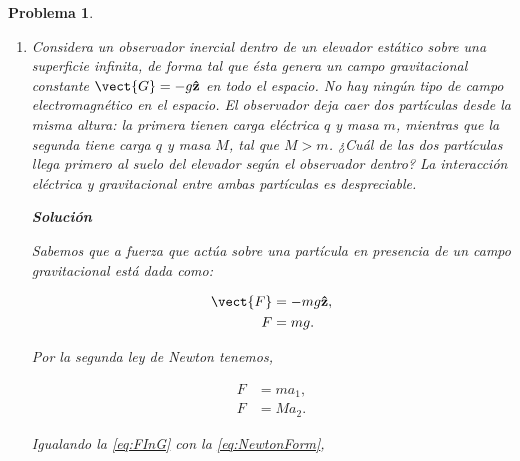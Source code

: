 \documentclass[12pt]{article}
\theoremstyle{break}
\newtheorem{exercise}{Problema}
\theoremstyle{nonumberbreak}
\DeclareRobustCommand{\uvec}[1]{{%
  \ifcsname uvec#1\endcsname
     \csname uvec#1\endcsname
   \else
    \bm{\hat{\mathbf{#1}}}%
   \fi
}}%
\newcommand*{\inlinesol}{\vspace*{10pt}\textbf{Solución}\vspace*{10pt}}
\begin{document}
\begin{exercise}
\begin{enumerate}[label = \alph*)]
            \begin{align*}
                ma_{1} &= Ma_{2},\\
                \dfrac{a_{1}}{a_{2}} &= \dfrac{M}{m}.
            \end{align*}

            Por hipótesis sabemos que \(M > m\), entonces

            \begin{align*}
                \dfrac{a_{1}}{a_{2}} &> 1,\\
                \Rightarrow a_{1} &> a_{2}. 
            \end{align*}

            Por lo tanto, la partícula con masa \(m\) llega primero al suelo del elevador.

            \item Considera un observador inercial dentro de un elevador estático sobre una superficie infinita, de forma tal que ésta genera un campo gravitacional constante \(\vect{G} = -g\uvec{z}\) en todo el espacio. No hay ningún tipo de campo electromagnético en el espacio. El observador deja caer dos partículas desde la misma altura: la primera tienen carga eléctrica \(q\) y masa \(m\), mientras que la segunda tiene carga \(q\) y masa \(M\), tal que \(M > m\). ¿Cuál de las dos partículas llega primero al suelo del elevador según el observador dentro? La interacción eléctrica y gravitacional entre ambas partículas es despreciable.

            \inlinesol

            Sabemos que a fuerza que actúa sobre una partícula en presencia de un campo gravitacional está dada como:
            
            \begin{align}
                \vect{F} &= -mg\uvec{z},\nonumber\\
                F &= mg.\label{eq:FInG}
            \end{align}

            Por la segunda ley de Newton tenemos,

            \begin{align}
                F &= ma_{1},\label{eq:NewtonForm}\\
                F &= Ma_{2}.\label{eq:NewtonForM} 
            \end{align}

            Igualando la \cref{eq:FInG} con la \cref{eq:NewtonForm},
                        

\end{enumerate}
\end{exercise}
\end{document}
